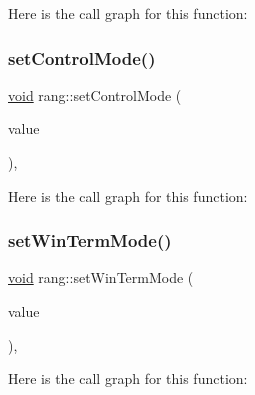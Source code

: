 Here is the call graph for this function\+:
\mbox{\label{namespacerang_ae72965d5fd9f42ddf3bc7101d3e2f423}} 
\subsubsection{\texorpdfstring{set\+Control\+Mode()}{setControlMode()}}
{\footnotesize\ttfamily \mbox{\hyperlink{glad_8h_a950fc91edb4504f62f1c577bf4727c29}{void}} rang\+::set\+Control\+Mode (\begin{DoxyParamCaption}\item[{const \mbox{\hyperlink{namespacerang_a9a0ad8048ed47f032f5bdb687ba64164}{control}}}]{value }\end{DoxyParamCaption})\hspace{0.3cm}{\ttfamily [inline]}, {\ttfamily [noexcept]}}

Here is the call graph for this function\+:
\mbox{\label{namespacerang_a34533a6f3dc063a47816a626f8f4d6c0}} 
\subsubsection{\texorpdfstring{set\+Win\+Term\+Mode()}{setWinTermMode()}}
{\footnotesize\ttfamily \mbox{\hyperlink{glad_8h_a950fc91edb4504f62f1c577bf4727c29}{void}} rang\+::set\+Win\+Term\+Mode (\begin{DoxyParamCaption}\item[{const \mbox{\hyperlink{namespacerang_af70222b38ecff8fc5aef0958d052b433}{rang\+::win\+Term}}}]{value }\end{DoxyParamCaption})\hspace{0.3cm}{\ttfamily [inline]}, {\ttfamily [noexcept]}}

Here is the call graph for this function\+:
